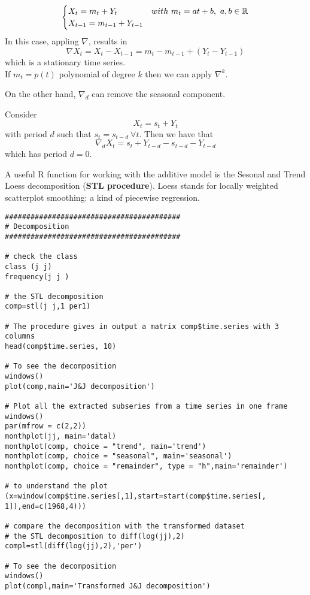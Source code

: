\begin{example}
    \[
        \begin{cases}
            X_t=m_t+Y_t&with\ m_t=at+b,\ a,b\in\mathbb{R}\\
            X_{t-1}=m_{t-1}+Y_{t-1}
        \end{cases}    
    \]
    In this case, appling $\nabla$, results in
    \[
        \nabla X_t=X_t-X_{t-1}=m_t-m_{t-1}+(Y_t-Y_{t-1})  
    \]
    which is a stationary time series.\\
    If $m_t=p(t)$ polynomial of degree $k$ then we can apply $\nabla^k$.
\end{example}

On the other hand, $\nabla_d$ can remove the seasonal component.

\begin{example}
    Consider
    \[
        X_t=s_t+Y_t
    \]
    with period $d$ such that $s_t=s_{t-d}\ \forall t$. Then we have that
    \[
        \nabla_d X_t=s_t+Y_{t-d}-s_{t-d}-Y_{t-d}    
    \]
    which has period $d=0$.
\end{example}

A useful R function for working with the additive model is the Sesonal and Trend Loess decomposition (\textbf{STL procedure}). Loess stands for locally weighted scatterplot smoothing: a kind of piecewise regression.

\begin{example}
    \begin{verbatim}
#########################################
# Decomposition
#########################################

# check the class 
class (j j)
frequency(j j )

# the STL decomposition 
comp=stl(j j,1 per1)

# The procedure gives in output a matrix comp$time.series with 3 columns 
head(comp$time.series, 10)

# To see the decomposition 
windows()
plot(comp,main='J&J decomposition')

# Plot all the extracted subseries from a time series in one frame 
windows()
par(mfrow = c(2,2))
monthplot(jj, main='datal)
monthplot(comp, choice = "trend", main='trend')
monthplot(comp, choice = "seasonal", main='seasonal')
monthplot(comp, choice = "remainder", type = "h",main='remainder')

# to understand the plot
(x=window(comp$time.series[,1],start=start(comp$time.series[,
1]),end=c(1968,4)))

# compare the decomposition with the transformed dataset
# the STL decomposition to diff(log(jj),2) 
compl=stl(diff(log(jj),2),'per')

# To see the decomposition 
windows()
plot(compl,main='Transformed J&J decomposition')
    \end{verbatim}
\end{example}

